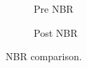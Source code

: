 \documentclass[11pt,a4paper]{article}
\begin{document}
\begin{figure}[H]
  \centering
  \begin{subfigure}[b]{0.48\textwidth}
    \centering
    \caption{Pre NBR}
  \end{subfigure}\hfill
  \begin{subfigure}[b]{0.48\textwidth}
    \centering
    \caption{Post NBR}
  \end{subfigure}
  \caption{NBR comparison.}
\end{figure}
\FloatBarrier
\end{document}
